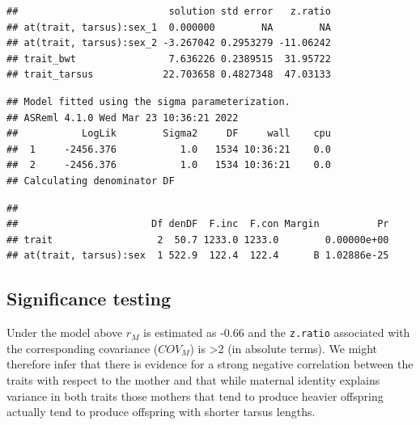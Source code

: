 \documentclass[
  12pt,
]{book}
\newenvironment{Shaded}{\begin{snugshade}}{\end{snugshade}}
\newcommand{\DataTypeTok}[1]{\textcolor[rgb]{0.13,0.29,0.53}{#1}}
\newcommand{\DecValTok}[1]{\textcolor[rgb]{0.00,0.00,0.81}{#1}}
\newcommand{\KeywordTok}[1]{\textcolor[rgb]{0.13,0.29,0.53}{\textbf{#1}}}
\newcommand{\NormalTok}[1]{#1}
\newcommand{\OperatorTok}[1]{\textcolor[rgb]{0.81,0.36,0.00}{\textbf{#1}}}
\newcommand{\OtherTok}[1]{\textcolor[rgb]{0.56,0.35,0.01}{#1}}
\newcommand{\StringTok}[1]{\textcolor[rgb]{0.31,0.60,0.02}{#1}}
\begin{document}
\begin{Shaded}
\end{Shaded}

\begin{verbatim}
##                          solution std error   z.ratio
## at(trait, tarsus):sex_1  0.000000        NA        NA
## at(trait, tarsus):sex_2 -3.267042 0.2953279 -11.06242
## trait_bwt                7.636226 0.2389515  31.95722
## trait_tarsus            22.703658 0.4827348  47.03133
\end{verbatim}

\begin{verbatim}
## Model fitted using the sigma parameterization.
## ASReml 4.1.0 Wed Mar 23 10:36:21 2022
##           LogLik        Sigma2     DF     wall    cpu
##  1     -2456.376           1.0   1534 10:36:21    0.0
##  2     -2456.376           1.0   1534 10:36:21    0.0
## Calculating denominator DF
\end{verbatim}

\begin{verbatim}
## 
##                       Df denDF  F.inc  F.con Margin          Pr
## trait                  2  50.7 1233.0 1233.0        0.00000e+00
## at(trait, tarsus):sex  1 522.9  122.4  122.4      B 1.02886e-25
\end{verbatim}

\hypertarget{significance-testing}{%
\subsection{Significance testing}\label{significance-testing}}

Under the model above \(r_M\) is estimated as -0.66 and the \texttt{z.ratio} associated with the corresponding covariance (\(COV_M\)) is \textgreater2 (in absolute terms). We might therefore infer that there is evidence for a strong negative correlation between the traits with respect to the mother and that while maternal identity explains variance in both traits those mothers that tend to produce heavier offspring actually tend to produce offspring with shorter tarsus lengths.
\end{document}
